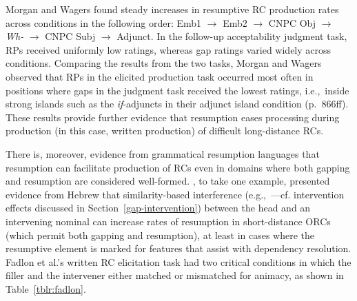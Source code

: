 Morgan and Wagers found steady increases in resumptive RC production rates across conditions in the following order: Emb1 $\rightarrow$ Emb2 $\rightarrow$ CNPC Obj $\rightarrow$ \textit{Wh-} $\rightarrow$ CNPC Subj $\rightarrow$ Adjunct. In the follow-up acceptability judgment task, RPs received uniformly low ratings, whereas gap ratings varied widely across conditions. Comparing the results from the two tasks, Morgan and Wagers observed that RPs in the elicited production task occurred most often in positions where gaps in the judgment task received the lowest ratings, i.e.,~inside strong islands such as the \textit{if}-adjuncts in their adjunct island condition (p.~866ff). These results provide further evidence that resumption eases processing during production (in this case, written production) of difficult long-distance RCs. 

There is, moreover, evidence from grammatical resumption languages that resumption can facilitate production of RCs even in domains where both gapping and resumption are considered well-formed. \textcite{fadlon.etal2019}, to take one example, presented evidence from Hebrew that similarity-based interference (e.g.,~\cite{gordon.etal2001,gordon.etal2004,gordon.etal2006}---cf. intervention effects discussed in Section~\ref{gap-intervention}) between the head and an intervening nominal can increase rates of resumption in short-distance ORCs (which permit both gapping and resumption), at least in cases where the resumptive element is marked for features that assist with dependency resolution. Fadlon et al.'s written RC elicitation task had two critical conditions in which  the filler and the intervener either matched or mismatched for animacy, as shown in Table~\ref{tblr:fadlon}.

